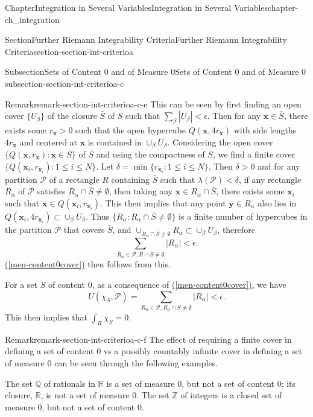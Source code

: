 \documentclass[oneside,10pt,]{book}
\newcommand{\xreffont}{\relax}
\numberwithin{equation}{section}
\newcommand{\bx}{\mathbf{x}}
\newcommand{\by}{\mathbf{y}}
\newcommand{\bbR}{\mathbb{R}}
\newcommand{\bbZ}{\mathbb{Z}}
\newcommand{\bbQ}{\mathbb{Q}}
\newcommand{\cP}{\mathcal{P}}
\newcommand{\lt}{<}
\begin{document}
\begin{chapterptx}{Chapter}{Integration in Several Variables}{}{Integration in Several Variables}{}{}{chapter-ch_integration}
\begin{sectionptx}{Section}{Further Riemann Integrability Criteria}{}{Further Riemann Integrability Criteria}{}{}{section-section-int-criterioa}
\begin{subsectionptx}{Subsection}{Sets of Content \(0\) and of Measure \(0\)}{}{Sets of Content \(0\) and of Measure \(0\)}{}{}{subsection-section-int-criterioa-c}
\begin{remark}{Remark}{}{remark-section-int-criterioa-c-e}
This can be seen by first finding an open cover \(\{ U_{\beta}\}\) of the closure \(\bar S\) of \(S\) such that \(\sum_{\beta} |U_{\beta}| \lt \epsilon\). Then for any \(\bx \in \bar S\), there exists some \(r_{\bx}>0\) such that the open hypercube \(Q(\bx, 4 r_{\bx})\) with side lengths \(4 r_{\bx}\) and centered at \(\bx\) is contained in \(\cup_{\beta} U_{\beta}\). Considering the open cover \(\{ Q(\bx,  r_{\bx}): \bx \in \bar S\}\) of \(\bar S\) and using the compactness of  \(\bar S\), we find a finite cover \(\{ Q(\bx_{i},  r_{\bx_{i}}):  1\le i \le N\}\). Let \(\delta =\min\{r_{\bx_{i}}:  1\le i \le N\}\). Then \(\delta >0\) and for any partition \(\cP\) of a rectangle  \(R\) containing \(\bar S\) such that \(\lambda (\cP) \lt \delta\), if any rectangle  \(R_{\alpha}\) of \(\cP\) satisfies \(R_{\alpha}\cap \bar S \ne \emptyset\), then taking any \(\bx \in R_{\alpha}\cap \bar S\), there exists some \(\bx_{i}\) such that \(\bx \in Q(\bx_{i},  r_{\bx_{i}})\). This then implies that any point \(\by \in R_{\alpha}\) also lies in \(Q(\bx_{i},  4r_{\bx_{i}})\subset \cup_{\beta} U_{\beta}\). Thus \(\{R_{\alpha}: R_{\alpha}\cap \bar S \ne \emptyset\}\) is a finite number of hypercubes in the partition \(\cP\) that covers \(\bar S\), and \(\cup_{R_{\alpha}\cap \bar S \ne \emptyset} R_{\alpha} 
\subset \cup_{\beta} U_{\beta}\), therefore%
\begin{equation*}
\sum_{R_{\alpha}\in \cP, R\cap \bar S \ne \emptyset} |R_{\alpha}| \lt \epsilon.
\end{equation*}
\hyperref[men-content0cover]{({\xreffont\ref{men-content0cover}})} then follows from this.%
\par
For a set \(S\) of content \(0\), as a consequence	 of \hyperref[men-content0cover]{({\xreffont\ref{men-content0cover}})}, we have%
\begin{equation}
U(\chi_{S},\cP)= 
\sum_{R_{\alpha}\in \cP, R_{\alpha}\cap  S \ne \emptyset} |R_{\alpha}| \lt \epsilon.\label{men-content0covers}
\end{equation}
This then implies that \(\int_{R} \chi_{S} =0\).%
\end{remark}
\begin{remark}{Remark}{}{remark-section-int-criterioa-c-f}%
The effect of requiring a finite cover in defining a set of content \(0\) vs a possibly countably infinite cover in defining a set of measure  \(0\) can be seen through the following examples.%
\par
The set \(\bbQ\) of rationals in \(\bbR\) is a set of measure \(0\), but not a set of content \(0\); its closure, \(\bbR\), is not a set of measure \(0\). The set \(\bbZ\) of integers is a closed set of measure \(0\), but not a set of content \(0\).%

\end{remark}
\end{subsectionptx}
\end{sectionptx}
\end{chapterptx}
\end{document}
